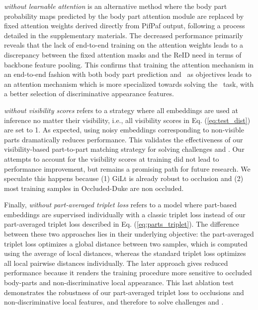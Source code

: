 \documentclass[10pt,twocolumn,letterpaper]{article}
\begin{document}
\textit{{\model} without learnable attention} is an alternative method where the  body part probability maps  predicted by the body part attention module are replaced by fixed attention weights derived directly from PifPaf output, following a process detailed in the supplementary materials.
The decreased performance primarily reveals that the lack of end-to-end training on the attention weights leads to a discrepancy between the fixed attention masks and the ReID need in terms of backbone feature pooling.
This confirms that training the attention mechanism in an end-to-end fashion with both body part prediction and \reid\ as objectives leads to an attention mechanism which is more specialized towards solving the \reid\ task, with a better selection of discriminative appearance features.


\textit{{\model} without visibility scores} refers to a strategy where all embeddings are used at inference no matter their visibility, i.e., all visibility scores  in Eq. (\ref{eq:test_dist}) are set to 1.
As expected, using noisy embeddings corresponding to non-visible parts dramatically reduces performance.
This validates the effectiveness of our visibility-based part-to-part matching strategy for solving challenges  and . 
Our attempts to account for the visibility scores at training did not lead to performance improvement, but remains a promising path for future research. 
We speculate this happens because (1) GiLt is already robust to occlusion and (2) most training samples in Occluded-Duke are non occluded.






Finally, \textit{{\model} without part-averaged triplet loss} refers to a model where part-based embeddings are supervised individually with a classic triplet loss \cite{triplet} instead of our part-averaged triplet loss described in Eq. (\ref{eq:parts_triplet}).
The difference between these two approaches lies in their underlying objective: the part-averaged triplet loss optimizes a global distance between two samples, which is computed using the average of local distances, whereas the standard triplet loss optimizes all local pairwise distances individually.
The later approach gives reduced performance because it renders the training procedure more sensitive to occluded body-parts and non-discriminative local appearance.
This last ablation test demonstrates the robustness of our part-averaged triplet loss to occlusions and non-discriminative local features, and therefore to solve challenges  and .
\end{document}

